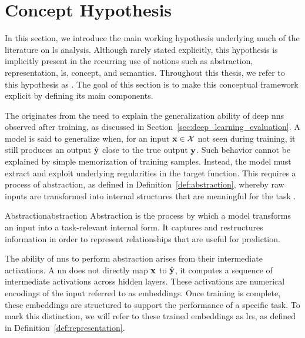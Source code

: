 \section{Concept Hypothesis}
\label{sec:latent_space_analysis_concept_hypothesis}

In this section, we introduce the main working hypothesis underlying much of the literature on \gls{ls} analysis.  
Although rarely stated explicitly, this hypothesis is implicitly present in the recurring use of notions such as abstraction, representation, \gls{ls}, concept, and semantics.
Throughout this thesis, we refer to this hypothesis as \ConceptHypothesisName.
The goal of this section is to make this conceptual framework explicit by defining its main components.  

The \ConceptHypothesisName originates from the need to explain the generalization ability of deep \glspl{nn} observed after training, as discussed in Section~\ref{sec:deep_learning_evaluation}.
A model is said to generalize when, for an input $\mathbf{x} \in \mathcal{X}$ not seen during training, it still produces an output $\hat{\mathbf{y}}$ close to the true output $\mathbf{y}$.  
Such behavior cannot be explained by simple memorization of training samples.  
Instead, the model must extract and exploit underlying regularities in the target function.  
This requires a process of abstraction, as defined in Definition~\ref{def:abstraction}, whereby raw inputs are transformed into internal structures that are meaningful for the task \parencite{bengio2014representationlearningreviewnew}.  

\begin{definition}{Abstraction}{abstraction}
Abstraction is the process by which a model transforms an input into a task-relevant internal form.  
It captures and restructures information in order to represent relationships that are useful for prediction.  
\end{definition}

The ability of \glspl{nn} to perform abstraction arises from their intermediate activations.
A \gls{nn} does not directly map $\mathbf{x}$ to $\hat{\mathbf{y}}$, it computes a sequence of intermediate activations across hidden layers.
These activations are numerical encodings of the input referred to as embeddings.
Once training is complete, these embeddings are structured to support the performance of a specific task.
To mark this distinction, we will refer to these trained embeddings as \glspl{lr}, as defined in Definition~\ref{def:representation}.

